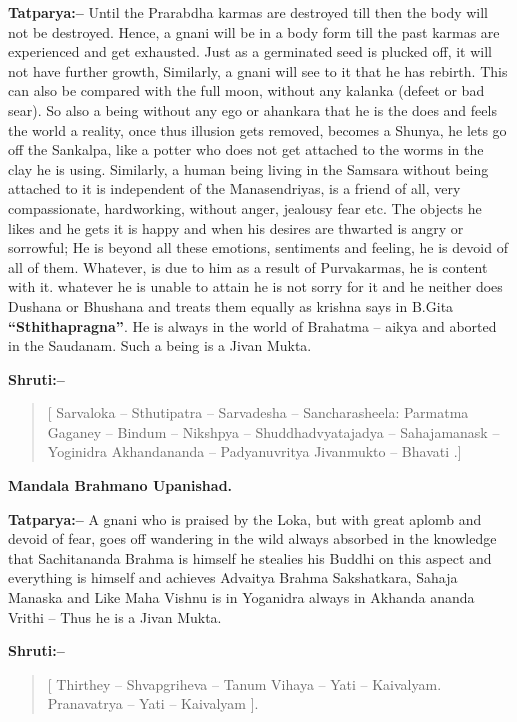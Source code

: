 \textbf{Tatparya:–} Until the Prarabdha karmas are destroyed till then the body will not be destroyed. Hence, a gnani will be in a body form till the past karmas are experienced and get exhausted. Just as a germinated seed is plucked off, it will not have further growth, Similarly, a gnani will see to it that he has rebirth. This can also be compared with the full moon, without any kalanka (defeet or bad sear). So also a being without any ego or ahankara that he is the does and feels the world a reality, once thus illusion gets removed, becomes a Shunya, he lets go off the Sankalpa, like a potter who does not get attached to the worms in the clay he is using. Similarly, a human being living in the Samsara without being attached to it is independent of the Manasendriyas, is a friend of all, very compassionate, hardworking, without anger, jealousy fear etc. The objects he likes and he gets it is happy and when his desires are thwarted is angry or sorrowful; He is beyond all these emotions, sentiments and feeling, he is devoid of all of them. Whatever, is due to him as a result of Purvakarmas, he is content with it. whatever he is unable to attain he is not sorry for it and he neither does Dushana or Bhushana and treats them equally as krishna says in B.Gita \textbf{“Sthithapragna”}. He is always in the world of Brahatma – aikya and aborted in the Saudanam. Such a being is a Jivan Mukta.

\textbf{Shruti:–}

\begin{verse}
[ Sarvaloka – Sthutipatra – Sarvadesha – Sancharasheela:  Parmatma Gaganey – Bindum – Nikshpya – Shuddhadvyatajadya – Sahajamanask – Yoginidra Akhandananda – Padyanuvritya Jivanmukto – Bhavati .]
\end{verse}

\begin{flushright}
\textbf{Mandala Brahmano Upanishad.}
\end{flushright}

\textbf{Tatparya:–} A gnani who is praised by the Loka, but with great aplomb and devoid of fear, goes off wandering in the wild always absorbed in the knowledge that Sachitananda Brahma is himself he stealies his Buddhi on this aspect and everything is himself and achieves Advaitya Brahma Sakshatkara, Sahaja Manaska and Like Maha Vishnu is in Yoganidra always in Akhanda ananda Vrithi – Thus he is a Jivan Mukta.

\textbf{Shruti:–}

\begin{verse}
[ Thirthey – Shvapgriheva – Tanum Vihaya – Yati – Kaivalyam.  Pranavatrya – Yati – Kaivalyam ].
\end{verse}


